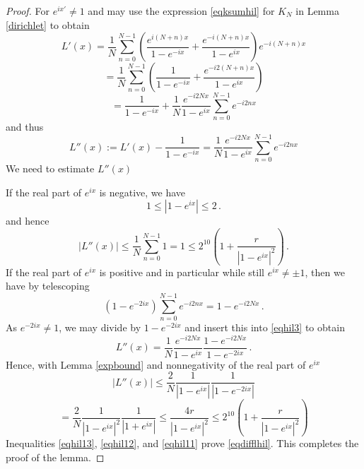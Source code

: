 {\begin{proof}
For $e^{ix'}\neq 1$
and may use the expression
\eqref{eqksumhil} for $K_N$
in Lemma \ref{dirichlet} to obtain
\begin{equation*}
    {L'}(x)=  \frac 1N\sum_{n=0}^{N-1}
     \left(\frac{e^{i(N+n)x}}{1-e^{-ix}}
      +\frac {e^{-i(N+n)x}}{1-e^{ix}}\right) e^{-i(N+n)x}
\end{equation*}
\begin{equation*}
    =  \frac 1N\sum_{n=0}^{N-1}
    \left(\frac{1}{1-e^{-ix}}
      +\frac {e^{-i2(N+n)x}}{1-e^{ix}}\right)
\end{equation*}
\begin{equation}\label{eqhil3}
    =  \frac{1}{1-e^{-ix}} +
     \frac 1N \frac {e^{-i2Nx}}{1-e^{ix}}
     \sum_{n=0}^{N-1}
    {e^{-i2nx}}
\end{equation}
and thus
\begin{equation}
  L''(x):={L'}(x)  -\frac{1}{1-e^{-ix}}=\frac 1N \frac {e^{-i2Nx}}{1-e^{ix}}
     \sum_{n=0}^{N-1}
    {e^{-i2nx}}
\end{equation}
We need to estimate $L''(x)$


If the real part of
$e^{ix}$ is negative, we have
\begin{equation}
  1\le   |1-e^{ix}|\le 2\, .
\end{equation}
and hence
\begin{equation}\label{eqhil12}
    |L''(x)|\le
     \frac 1N
     \sum_{n=0}^{N-1}
    1=1\le 2^{10}\left(1+\frac r{|1-e^{ix}|^2}\right)\, .
\end{equation}
If the real part of $e^{ix}$ is positive and in particular while still $e^{ix}\neq \pm 1$, then  we have by telescoping
\begin{equation}
 (1-e^{-2ix})
     \sum_{n=0}^{N-1}
    {e^{-i2nx}}=1-e^{-i2Nx}\, .
\end{equation}
As $e^{-2ix}\neq 1$, we may divide by $1-e^{-2ix}$ and insert this into
\eqref{eqhil3} to obtain
\begin{equation}
 L''(x)=
           \frac 1N \frac {e^{-i2Nx}}{1-e^{ix}}
     \frac{1-e^{-i2Nx}}{1-e^{-2ix}}\, .
\end{equation}
Hence, with Lemma \ref{expbound} and nonnegativity of the real part of $e^{ix}$
\begin{equation*}
    |L''(x)|
 \le \frac 2 N \frac {1}{|1-e^{ix}|}
     \frac{1}{|1-e^{-2ix}|}
 \end{equation*}
\begin{equation}\label{eqhil11}
    = \frac 2 N \frac {1}{|1-e^{ix}|^2}
     \frac{1}{|1+e^{ix}|}\le
 \frac {4r}{|1-e^{ix}|^2}\le 2^{10} \left (1+\frac {r}{|1-e^{ix}|^2}\right)
\end{equation}
Inequalities \eqref{eqhil13}, \eqref{eqhil12}, and \eqref{eqhil11} prove \eqref{eqdifflhil}. This completes the proof of the lemma.
\end{proof}


}
